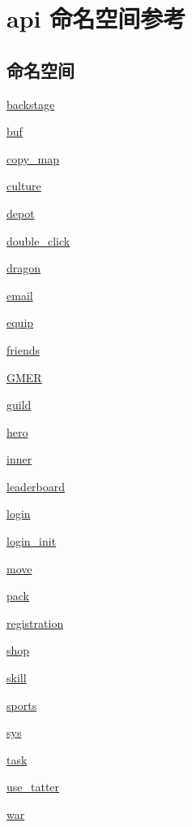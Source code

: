 \hypertarget{namespaceapi}{\section{api 命名空间参考}
\label{namespaceapi}
}
\subsection*{命名空间}
\begin{DoxyCompactItemize}
\item 
\hyperlink{namespaceapi_1_1backstage}{backstage}
\item 
\hyperlink{namespaceapi_1_1buf}{buf}
\item 
\hyperlink{namespaceapi_1_1copy__map}{copy\-\_\-map}
\item 
\hyperlink{namespaceapi_1_1culture}{culture}
\item 
\hyperlink{namespaceapi_1_1depot}{depot}
\item 
\hyperlink{namespaceapi_1_1double__click}{double\-\_\-click}
\item 
\hyperlink{namespaceapi_1_1dragon}{dragon}
\item 
\hyperlink{namespaceapi_1_1email}{email}
\item 
\hyperlink{namespaceapi_1_1equip}{equip}
\item 
\hyperlink{namespaceapi_1_1friends}{friends}
\item 
\hyperlink{namespaceapi_1_1_g_m_e_r}{G\-M\-E\-R}
\item 
\hyperlink{namespaceapi_1_1guild}{guild}
\item 
\hyperlink{namespaceapi_1_1hero}{hero}
\item 
\hyperlink{namespaceapi_1_1inner}{inner}
\item 
\hyperlink{namespaceapi_1_1leaderboard}{leaderboard}
\item 
\hyperlink{namespaceapi_1_1login}{login}
\item 
\hyperlink{namespaceapi_1_1login__init}{login\-\_\-init}
\item 
\hyperlink{namespaceapi_1_1move}{move}
\item 
\hyperlink{namespaceapi_1_1pack}{pack}
\item 
\hyperlink{namespaceapi_1_1registration}{registration}
\item 
\hyperlink{namespaceapi_1_1shop}{shop}
\item 
\hyperlink{namespaceapi_1_1skill}{skill}
\item 
\hyperlink{namespaceapi_1_1sports}{sports}
\item 
\hyperlink{namespaceapi_1_1sys}{sys}
\item 
\hyperlink{namespaceapi_1_1task}{task}
\item 
\hyperlink{namespaceapi_1_1use__tatter}{use\-\_\-tatter}
\item 
\hyperlink{namespaceapi_1_1war}{war}
\end{DoxyCompactItemize}
